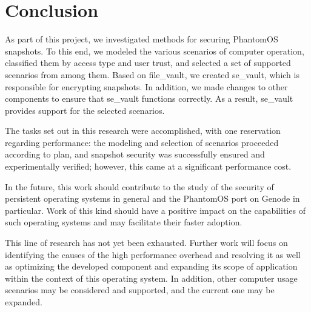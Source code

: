 \chapter{Conclusion}

As part of this project, we investigated methods for securing PhantomOS snapshots. To this end, we modeled the various scenarios of computer operation, classified them by access type and user trust, and selected a set of supported scenarios from among them. Based on file\_vault, we created se\_vault, which is responsible for encrypting snapshots. In addition, we made changes to other components to ensure that se\_vault functions correctly. As a result, se\_vault provides support for the selected scenarios.

The tasks set out in this research were accomplished, with one reservation regarding performance: the modeling and selection of scenarios proceeded according to plan, and snapshot security was successfully ensured and experimentally verified; however, this came at a significant performance cost.

In the future, this work should contribute to the study of the security of persistent operating systems in general and the PhantomOS port on Genode in particular. Work of this kind should have a positive impact on the capabilities of such operating systems and may facilitate their faster adoption.

This line of research has not yet been exhausted. Further work will focus on identifying the causes of the high performance overhead and resolving it as well as optimizing the developed component and expanding its scope of application within the context of this operating system. In addition, other computer usage scenarios may be considered and supported, and the current one may be expanded.

\label{chap:conclusion}
